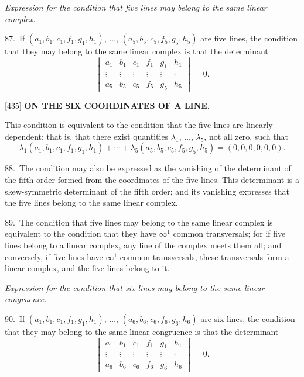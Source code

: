 \documentclass[12pt,a4paper]{article}
\newcommand{\paperref}[1]{\textup{[#1]}}
\theoremstyle{definition}
\begin{document}
\textit{Expression for the condition that five lines may belong to the same linear complex.}

87.~If $(a_1, b_1, c_1, f_1, g_1, h_1)$, $\ldots$, $(a_5, b_5, c_5, f_5, g_5, h_5)$ are five lines, the condition that they may belong to the same linear complex is that the determinant
\[
\begin{vmatrix}
a_1 & b_1 & c_1 & f_1 & g_1 & h_1 \\
\vdots & \vdots & \vdots & \vdots & \vdots & \vdots \\
a_5 & b_5 & c_5 & f_5 & g_5 & h_5
\end{vmatrix}
= 0.
\]

\newpage
\setcounter{page}{97}

\noindent\paperref{435}\quad
\textbf{ON THE SIX COORDINATES OF A LINE.}

This condition is equivalent to the condition that the five lines are linearly dependent; that is, that there exist quantities $\lambda_1$, $\ldots$, $\lambda_5$, not all zero, such that
\[
\lambda_1 (a_1, b_1, c_1, f_1, g_1, h_1) + \cdots + \lambda_5 (a_5, b_5, c_5, f_5, g_5, h_5) = (0, 0, 0, 0, 0, 0).
\]

88.~The condition may also be expressed as the vanishing of the determinant of the fifth order formed from the coordinates of the five lines. This determinant is a skew-symmetric determinant of the fifth order; and its vanishing expresses that the five lines belong to the same linear complex.

89.~The condition that five lines may belong to the same linear complex is equivalent to the condition that they have $\infty^1$ common transversals; for if five lines belong to a linear complex, any line of the complex meets them all; and conversely, if five lines have $\infty^1$ common transversals, these transversals form a linear complex, and the five lines belong to it.

\textit{Expression for the condition that six lines may belong to the same linear congruence.}

90.~If $(a_1, b_1, c_1, f_1, g_1, h_1)$, $\ldots$, $(a_6, b_6, c_6, f_6, g_6, h_6)$ are six lines, the condition that they may belong to the same linear congruence is that the determinant
\[
\begin{vmatrix}
a_1 & b_1 & c_1 & f_1 & g_1 & h_1 \\
\vdots & \vdots & \vdots & \vdots & \vdots & \vdots \\
a_6 & b_6 & c_6 & f_6 & g_6 & h_6
\end{vmatrix}
= 0.
\]
\end{document}
